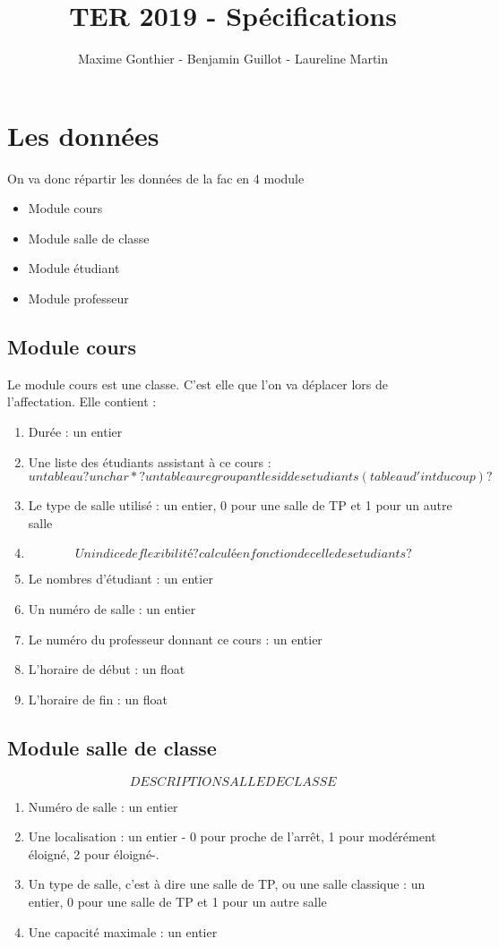 \documentclass[a4paper,11pt]{article}
\title{TER 2019 - Spécifications}
\author{Maxime Gonthier - Benjamin Guillot - Laureline Martin}
\begin{document}
	\clearpage
	\maketitle

\newpage
\section{Les données}
	On va donc répartir les données de la fac en 4 module\\
	\begin{itemize}
		\item Module cours
		\item Module salle de classe
		\item Module étudiant
		\item Module professeur
	\end{itemize}
	\subsection{Module cours}
		Le module cours est une classe. C'est elle que l'on va déplacer lors de l'affectation. Elle contient : 
		\begin{enumerate}
			\item Durée : un entier
			\item Une liste des étudiants assistant à ce cours : $$un tableau ? un char* ? un tableau regroupant les id des etudiants (tableau d'int du coup)? $$
			\item Le type de salle utilisé : un entier, 0 pour une salle de TP et 1 pour un autre salle
			\item $$Un indice de flexibilité ?  calculé en fonction de celle des etudiants ? $$
			\item Le nombres d'étudiant : un entier
			\item Un numéro de salle : un entier
			\item Le numéro du professeur donnant ce cours : un entier
			\item L'horaire de début : un float
			\item L'horaire de fin : un float
		\end{enumerate}
	\subsection{Module salle de classe}
		$$DESCRIPTION SALLE DE CLASSE$$
		\begin{enumerate}
			\item Numéro de salle : un entier
			\item Une localisation : un entier - 0 pour proche de l'arrêt, 1 pour modérément éloigné, 2 pour éloigné-. 
			\item Un type de salle, c'est à dire une salle de TP, ou une salle classique : un entier, 0 pour une salle de TP et 1 pour un autre salle
			\item Une capacité maximale : un entier
		\end{enumerate}
\end{document}
